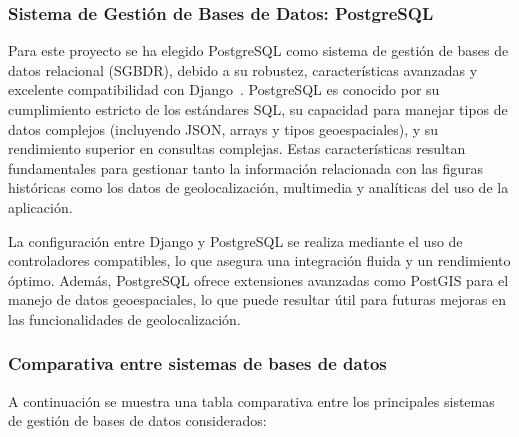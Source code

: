 \subsubsection{Sistema de Gestión de Bases de Datos: PostgreSQL}

Para este proyecto se ha elegido PostgreSQL como sistema de gestión de bases de datos relacional (SGBDR), debido a su robustez, características avanzadas y excelente compatibilidad con Django~\cite{postgresql2024}. PostgreSQL es conocido por su cumplimiento estricto de los estándares SQL, su capacidad para manejar tipos de datos complejos (incluyendo JSON, arrays y tipos geoespaciales), y su rendimiento superior en consultas complejas. Estas características resultan fundamentales para gestionar tanto la información relacionada con las figuras históricas como los datos de geolocalización, multimedia y analíticas del uso de la aplicación.

La configuración entre Django y PostgreSQL se realiza mediante el uso de controladores compatibles, lo que asegura una integración fluida y un rendimiento óptimo. Además, PostgreSQL ofrece extensiones avanzadas como PostGIS para el manejo de datos geoespaciales, lo que puede resultar útil para futuras mejoras en las funcionalidades de geolocalización.

\subsubsection{Comparativa entre sistemas de bases de datos}

A continuación se muestra una tabla comparativa entre los principales sistemas de gestión de bases de datos considerados:

